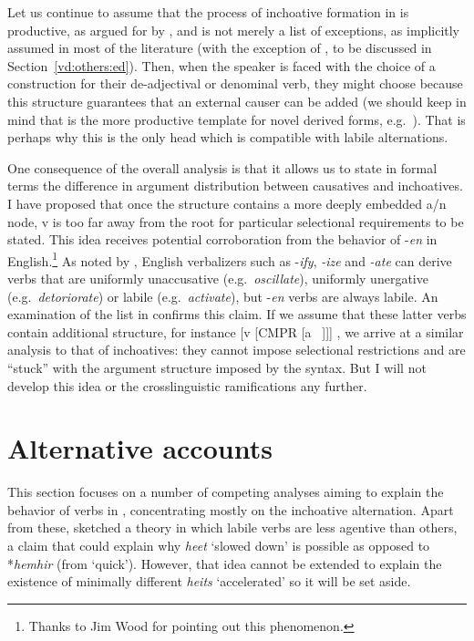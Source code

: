 Let us continue to assume that the process of inchoative formation in {\thif} is productive, as argued for by \cite{lev16}, and is not merely a list of exceptions, as implicitly assumed in most of the literature (with the exception of \citealt{doron03}, to be discussed in Section~\ref{vd:others:ed}). Then, when the speaker is faced with the choice of a construction for their de-adjectival or denominal verb, they might choose {\vd} because this structure guarantees that an external causer can be added (we should keep in mind that {\thit} is the more productive template for novel derived forms, e.g.~\citealt{laks11}). That is perhaps why this is the only head which is compatible with labile alternations.

One consequence of the overall analysis is that it allows us to state in formal terms the difference in argument distribution between causatives and inchoatives. %
I have proposed that once the structure contains a more deeply embedded a/n node, v is too far away from the root for particular selectional requirements to be stated. This idea receives potential corroboration from the behavior of -\emph{en} in English.\footnote{Thanks to Jim Wood for pointing out this phenomenon.} As noted by \cite{harley09n}, English verbalizers such as -\emph{ify}, \emph{-ize} and \emph{-ate} can derive verbs that are uniformly unaccusative (e.g.~\emph{oscillate}), uniformly unergative (e.g.~\emph{detoriorate}) or labile (e.g.~\emph{activate}), but -\emph{en} verbs are always labile. An examination of the list in \citet[245]{levin93} confirms this claim. If we assume that these latter verbs contain additional structure, for instance [v [CMPR [a ~\!]]] \citep{bobaljik12}, we arrive at a similar analysis to that of {\thif} inchoatives: they cannot impose selectional restrictions and are ``stuck'' with the argument structure imposed by the syntax. But I will not develop this idea or the crosslinguistic ramifications any further.


\section{Alternative accounts} \label{vd:others}
This section focuses on a number of competing analyses aiming to explain the behavior of verbs in {\thif}, concentrating mostly on the inchoative alternation. Apart from these, \cite{lev16} sketched a theory in which labile verbs are less agentive than others, a claim that could explain why \emph{heet} `slowed down' is possible as opposed to *\emph{hemhir} (from `quick'). However, that idea cannot be extended to explain the existence of minimally different \emph{hei{ts}} `accelerated' so it will be set aside.

